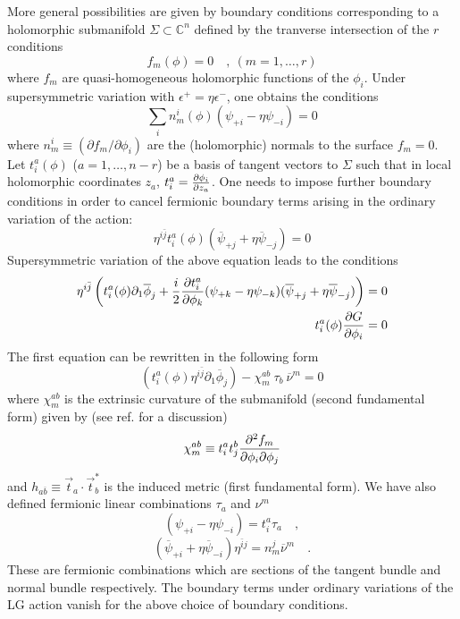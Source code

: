 \documentclass[a4paper,12pt]{article}
\def\Bbb{\mathbb}
\def\BC{\mbox{$\Bbb C$}} \def\BP{\mbox{$\Bbb P$}}
\begin{document}
More general possibilities are given by boundary conditions corresponding to
a holomorphic submanifold $\Sigma\subset\BC^n$
defined  by the tranverse intersection of the $r$ conditions
\begin{equation}
f_m(\phi)=0 \quad,\ (m=1,\ldots,r) 
\end{equation}
where $f_m$ are quasi-homogeneous holomorphic functions of the $\phi_i$. 
Under supersymmetric 
variation with $\epsilon^+=\eta \epsilon^-$, one obtains the conditions
\begin{equation}
\sum_i n_m^i(\phi) (\psi_{+i} -\eta \psi_{-i})=0
\end{equation}
where $n_m^i \equiv (\partial f_m/\partial\phi_i)$ are the (holomorphic)
normals to the surface $f_m=0$. 
Let $t_i^a(\phi)$ ($a=1,\ldots,n-r$) be a basis
of tangent vectors to $\Sigma$
such that in local holomorphic coordinates $z_a$, 
$t^a_i ={{\partial\phi_i}\over{\partial z_a}}$.
One needs to impose 
further boundary conditions in order to cancel fermionic
boundary terms arising in the ordinary variation of the action:
\begin{equation}
\eta^{i\bar{j}}t^a_i(\phi) (\overline{\psi}_{+j} +\eta \overline{\psi}_{-j})=0
\end{equation}
Supersymmetric variation of the above equation leads to the conditions
\begin{eqnarray}
\eta^{i\bar{j}} \left(t^a_i(\phi) \partial_1\overline{\phi}_j +{i\over2}
{{\partial t^a_i}\over{\partial\phi_k}} (\psi_{+k} -\eta \psi_{-k})
(\overline{\psi}_{+j}+\eta \overline{\psi}_{-j})\right)=0 \\
t^a_i(\phi) {{\partial G}\over{\partial\phi_i}} =0
\label{supbc}
\end{eqnarray}
The first equation can be  rewritten in the following  form
\begin{equation}
 \left(t^a_i(\phi) \eta^{i\bar{j}}\partial_1\overline{\phi}_j\right)
- \chi^{ab}_m\ \tau_b\ \overline{\nu}^m =0
\end{equation}
where $\chi^{ab}_m$ is the extrinsic curvature of the submanifold
(second fundamental form) given by (see ref. \cite{candelas} for
a discussion)
$$
\chi^{ab}_m \equiv t^a_i t^b_j{{\partial^2 f_m}\over{\partial\phi_i
\partial\phi_j}}
$$
and $h_{a\overline{b}}\equiv \vec{t}_a \cdot \vec{t}^*_b$
is the induced metric (first fundamental form). 
We have also defined fermionic linear combinations $\tau_a$ and $\nu^m$
$$
({\psi}_{+i} -\eta {\psi}_{-i})=t_i^a \tau_a\quad,$$ 
$$(\overline{\psi}_{+i} +\eta \overline{\psi}_{-i})\eta^{\bar{i}j}=
n_m^j\overline{\nu}^m\quad.$$
These are fermionic combinations
which are sections of the tangent bundle and normal bundle
respectively. The boundary terms under ordinary variations of the LG
action vanish for the above choice of boundary conditions.
\end{document}
